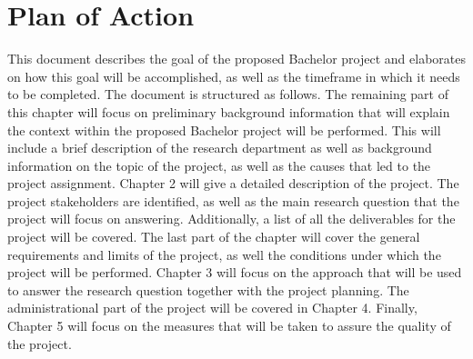 \section{Plan of Action}
This document describes the goal of the proposed Bachelor project and elaborates on how this goal will be accomplished, as well as the timeframe in which it needs to be completed. The document is structured as follows. The remaining part of this chapter will focus on preliminary background information that will explain the context within the proposed Bachelor project will be performed. This will include a brief description of the research department as well as background information on the topic of the project, as well as the causes that led to the project assignment. Chapter 2 will give a detailed description of the project. The project stakeholders are identified, as well as the main research question that the project will focus on answering. Additionally, a list of all the deliverables for the project will be covered. The last part of the chapter will cover the general requirements and limits of the project, as well the conditions under which the project will be performed. Chapter 3 will focus on the approach that will be used to answer the research question together with the project planning. The administrational part of the project will be covered in Chapter 4. Finally, Chapter 5 will focus on the measures that will be taken to assure the quality of the project.
